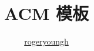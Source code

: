 \documentclass{probook}
\title{ACM 模板}
\author{\href{https://github.com/rogeryoungh}{rogeryoungh}}
\begin{document}
\newcommand\mfrac[2]{\dfrac{#1\smash[b]{\strut}}{#2\smash[t]{\strut}}}
\newcommand\ee{\mathrm{e}}
\newcommand\dd{\mathrm{d}}
\newcommand\uppi{\mathrm{\pi}}

\maketitle

\frontmatter

\tableofcontents

\mainmatter

\end{document}
